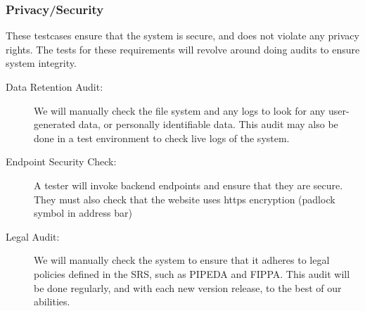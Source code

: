 \documentclass[12pt, titlepage]{article}
\begin{document}
\subsubsection{Privacy/Security}
These testcases ensure that the system is secure, and does not violate any
privacy rights. The tests for these requirements will revolve around doing
audits to ensure system integrity.

\begin{description}
  \item[Data Retention Audit:] We will manually check the file system and any
  logs to look for any user-generated data, or personally identifiable data.
  This audit may also be done in a test environment to check live logs of the
  system.
  \item[Endpoint Security Check:] A tester will invoke backend endpoints and
  ensure that they are secure. They must also check that the website uses https
  encryption (padlock symbol in address bar)
  \item[Legal Audit:] We will manually check the system to ensure that it
  adheres to legal policies defined in the SRS, such as PIPEDA and FIPPA. This
  audit will be done regularly, and with each new version release, to the best
  of our abilities.
\end{description}
\end{document}
